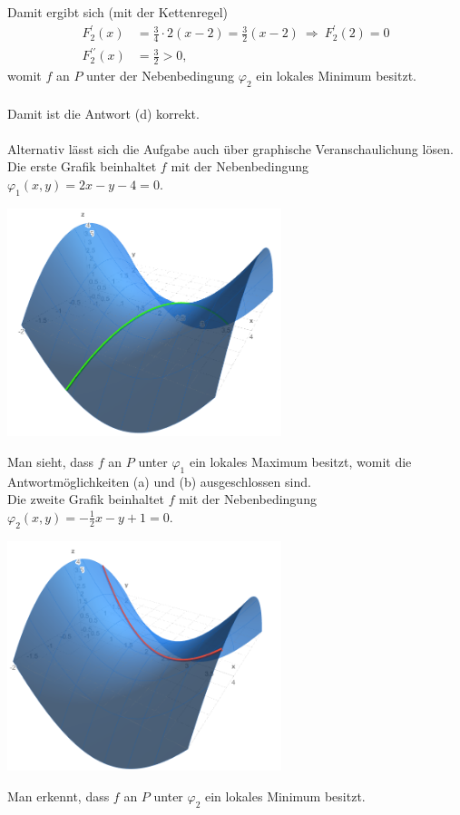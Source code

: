 Damit ergibt sich (mit der Kettenregel)
\begin{align*}
	F_2^\prime(x) &= \frac{3}{4} \cdot 2 (x -2 ) = \frac{3}{2} (x-2) \ \Rightarrow \ F_2^\prime(2) = 0\\
	F_2^{\prime \prime}(x) &= \frac{3}{2} > 0,
\end{align*}
womit $ f $ an $ P $ unter der Nebenbedingung $ \varphi_2 $ ein lokales Minimum besitzt.\\
\\
Damit ist die Antwort (d) korrekt.\\
\\
Alternativ lässt sich die Aufgabe auch über graphische Veranschaulichung lösen.
Die erste Grafik beinhaltet $ f $ mit der Nebenbedingung $\varphi_1(x,y) = 2x -y -4 = 0$.
\begin{center}
	\includegraphics[width=0.6\textwidth]{pictures/aufgabe2_1_1}
\end{center}
Man sieht, dass $ f $ an $ P $ unter $ \varphi_1 $ ein lokales Maximum besitzt, womit die Antwortmöglichkeiten (a) und (b) ausgeschlossen sind.\\
Die zweite Grafik beinhaltet $ f $ mit der Nebenbedingung $\varphi_2(x,y) = -\frac{1}{2}x -y +1 = 0$.
\begin{center}
	\includegraphics[width=0.6\textwidth]{pictures/aufgabe2_1_2}
\end{center}
Man erkennt, dass $ f $ an $ P $ unter $ \varphi_2 $ ein lokales Minimum besitzt.
\newpage

